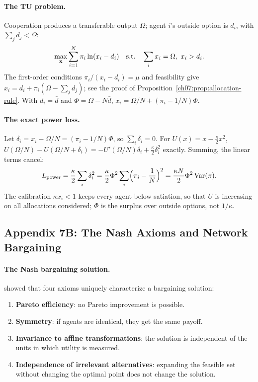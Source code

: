 \documentclass[../structural_economics_book.tex]{subfiles}
\begin{document}
\paragraph{The TU problem.} Cooperation produces a transferable output $\Omega$; agent $i$'s outside option is $d_i$, with $\sum_j d_j < \Omega$:
\begin{equation}
\max_{\mathbf{x}} \sum_{i=1}^N \pi_i \ln(x_i - d_i) \quad \text{s.t.} \quad \sum_i x_i = \Omega, \ x_i > d_i .
\end{equation}
The first-order conditions $\pi_i/(x_i - d_i) = \mu$ and feasibility give $x_i = d_i + \pi_i(\Omega - \sum_j d_j)$; see the proof of Proposition~\ref{ch07:prop:allocation-rule}. With $d_i = \bar{d}$ and $\Phi = \Omega - N\bar{d}$, $x_i = \Omega/N + (\pi_i - 1/N)\Phi$.

\paragraph{The exact power loss.} Let $\delta_i = x_i - \Omega/N = (\pi_i - 1/N)\Phi$, so $\sum_i \delta_i = 0$. For $U(x) = x - \frac{\kappa}{2}x^2$, $U(\Omega/N) - U(\Omega/N + \delta_i) = -U'(\Omega/N)\delta_i + \frac{\kappa}{2}\delta_i^2$ exactly. Summing, the linear terms cancel:
\begin{equation}
L_{\text{power}} = \frac{\kappa}{2}\sum_i \delta_i^2 = \frac{\kappa}{2}\Phi^2 \sum_i \Bigl(\pi_i - \frac1N\Bigr)^2 = \frac{\kappa N}{2}\Phi^2\operatorname{Var}(\pi).
\end{equation}
The calibration $\kappa x_i < 1$ keeps every agent below satiation, so that $U$ is increasing on all allocations considered; $\Phi$ is the surplus over outside options, not $1/\kappa$.


\subsection*{Appendix 7B: The Nash Axioms and Network Bargaining}
\label{ch07:app:nash_axioms}

\paragraph{The Nash bargaining solution.} \citet{nash1950bargaining} showed that four axioms uniquely characterize a bargaining solution:
\begin{enumerate}
\item \textbf{Pareto efficiency}: no Pareto improvement is possible.
\item \textbf{Symmetry}: if agents are identical, they get the same payoff.
\item \textbf{Invariance to affine transformations}: the solution is independent of the units in which utility is measured.
\item \textbf{Independence of irrelevant alternatives}: expanding the feasible set without changing the optimal point does not change the solution.
\end{enumerate}
\end{document}
